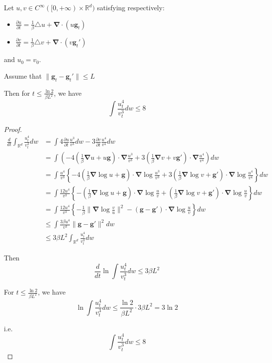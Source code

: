 \documentclass[final,12pt]{colt2018} %
\begin{document}
\begin{lemma}
\label{8 lemma}
  Let $u,v\in C^\infty([0,+\infty)\times\mathbb{R}^d)$ satisfying respectively:
  \begin{itemize}
    \item $\frac{\partial u}{\partial t}= \frac{1}{ \beta}\triangle u+\bm{\nabla}\cdot( u \bm{g}_t)$
    \item$\frac{\partial v}{\partial t}=\frac{1}{ \beta}\triangle v+\bm{\nabla}\cdot( v \bm{g}_t')$
  \end{itemize}
  and $u_0=v_0$.

  Assume that $\|\bm{g}_t-\bm{g}_t'\|\le L$
  
  Then for $t\le \frac{\ln 2}{\beta L^2}$, we have
  \begin{equation}
    \int \frac{u^4_t}{v^3_t}dw\le 8
  \end{equation}
\end{lemma}
\begin{proof}
  \begin{align*}
  \frac{d}{dt}\int_{\mathbb{R}^d} \frac{u^4_t}{v^3_t}dw&=\int 4\frac{\partial u}{\partial t}\frac{u^{3}}{v^{3}}dw-3\frac{\partial v}{\partial t} \frac{u^4}{v^4}dw\\
  &=\int \left(-4(\frac{1}{\beta}\bm{\nabla} u+ u\bm{g})\cdot\bm{\nabla}\frac{u^{3}}{v^{3}}+3(\frac{1}{\beta}\bm{\nabla} v+ v \bm{g}')\cdot\bm{\nabla}\frac{u^4}{v^4}\right)dw\\
  &=\int \frac{u^4}{v^{3}}\left\{-4 (\frac{1}{\beta}\bm{\nabla} \log u+ \bm{g})\cdot\bm{\nabla}\log\frac{u^{3}}{v^{3}}+3(\frac{1}{\beta}\bm{\nabla} \log v+  \bm{g}')\cdot\bm{\nabla}\log\frac{u^4}{v^4}\right\}dw\\
  &=\int \frac{12u^4}{v^{3}}\left\{-(\frac{1}{\beta}\bm{\nabla} \log u+ \bm{g})\cdot\bm{\nabla}\log\frac{u}{v}+(\frac{1}{\beta}\bm{\nabla} \log v+  \bm{g}')\cdot\bm{\nabla}\log\frac{u}{v}\right\}dw\\
  &=\int \frac{12u^4}{v^{3}}\left\{-\frac{1}{\beta}\|\bm{\nabla}\log\frac{v}{u}\|^2-(\bm{g}-\bm{g}')\cdot\bm{\nabla}\log\frac{u}{v}\right\}dw\\
  &\le\int \frac{3\beta u^4}{v^{3}} \|\bm{g}-\bm{g}'\|^2dw\\
  &\le 3 \beta L^2\int_{\mathbb{R}^d} \frac{u^4_t}{v^3_t}dw
  \end{align*}
  
  Then
  \begin{equation}
    \frac{d}{dt}\ln \int\frac{u^4_t}{v^3_t}dw\le 3 \beta L^2
  \end{equation}

  For $t\le \frac{\ln 2}{\beta L^2}$, we have
  \begin{equation}
    \ln\int \frac{u^4_t}{v^3_t}dw\le  \frac{\ln 2}{\beta L^2}\cdot 3 \beta L^2= 3\ln 2
  \end{equation}

  i.e.
  \begin{equation}
    \int \frac{u^4_t}{v^3_t}dw\le 8
  \end{equation}
\end{proof}
\end{document}
